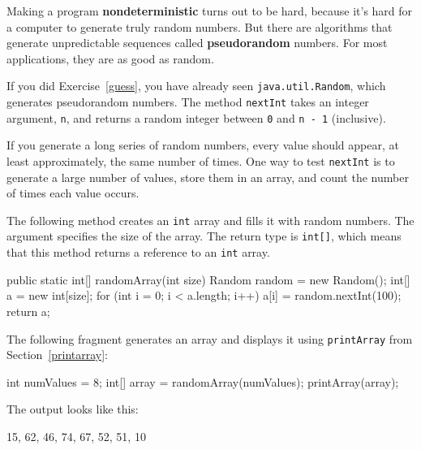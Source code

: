 \documentclass[12pt]{book}
\theoremstyle{exercise}
\newcommand{\java}[1]{\verb"#1"}
\begin{document}


Making a program {\bf nondeterministic} turns out to be hard, because it's hard for a computer to generate truly random numbers.
But there are algorithms that generate unpredictable sequences called {\bf pseudorandom} numbers.
For most applications, they are as good as random.



If you did Exercise~\ref{guess}, you have already seen \java{java.util.Random}, which generates pseudorandom numbers.
The method \java{nextInt} takes an integer argument, \java{n}, and returns a random integer between \java{0} and \java{n - 1} (inclusive).

If you generate a long series of random numbers, every value should appear, at least approximately, the same number of times.
One way to test \java{nextInt} is to generate a large number of values, store them in an array, and count the number of times each value occurs.

The following method creates an \java{int} array and fills it with random numbers.
The argument specifies the size of the array.
The return type is \java{int[]}, which means that this method returns a reference to an \java{int} array.

\begin{code}
    public static int[] randomArray(int size) {
    Random random = new Random();
        int[] a = new int[size];
        for (int i = 0; i < a.length; i++) {
            a[i] = random.nextInt(100);
        }
        return a;
    }
\end{code}

The following fragment generates an array and displays it using \java{printArray} from Section~\ref{printarray}:

\begin{code}
    int numValues = 8;
    int[] array = randomArray(numValues);
    printArray(array);
\end{code}

The output looks like this:

\begin{stdout}
{15, 62, 46, 74, 67, 52, 51, 10}
\end{stdout}
\end{document}
